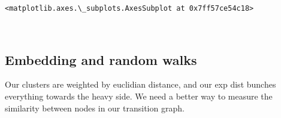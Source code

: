 \documentclass[11pt]{article}
\makeatletter
\newcommand{\boxspacing}{\kern\kvtcb@left@rule\kern\kvtcb@boxsep}
\newcommand{\prompt}[4]{
        \ttfamily\llap{{\color{#2}[#3]:\hspace{3pt}#4}}\vspace{-\baselineskip}
    }
\makeatother
\begin{document}
            \begin{tcolorbox}[breakable, size=fbox, boxrule=.5pt, pad at break*=1mm, opacityfill=0]
\prompt{Out}{outcolor}{46}{\boxspacing}
\begin{Verbatim}[commandchars=\\\{\}]
<matplotlib.axes.\_subplots.AxesSubplot at 0x7ff57ce54c18>
\end{Verbatim}
\end{tcolorbox}
        
    \begin{center}
    \end{center}
    { \hspace*{\fill} \\}
    
    \subsection{Embedding and random
walks}\label{embedding-and-random-walks}

Our clusters are weighted by euclidian distance, and our exp dist
bunches everything towards the heavy side. We need a better way to
measure the similarity between nodes in our transition graph.

    

    
\end{document}
